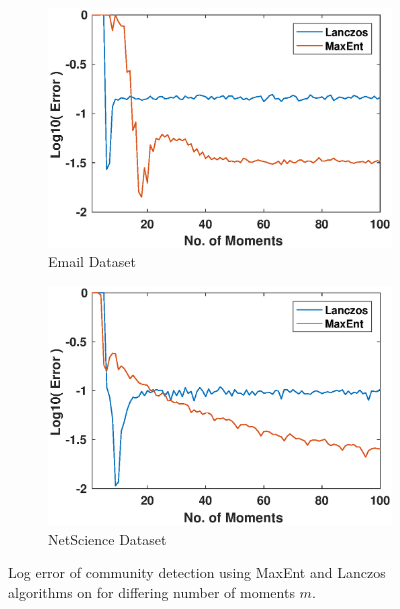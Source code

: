 \documentclass[letterpaper]{article} %
\begin{document}
\begin{figure}[t]
	\centering
	\begin{subfigure}
		\centering
		\includegraphics[trim=0.1cm 0cm 0.5cm 0.1cm, clip, width=1.0\linewidth]{Figures/Error_for_EmailL.eps}
		\caption{Email Dataset}
		\label{fig:emailerror}	
	\end{subfigure}%
	
	\begin{subfigure}
		\centering
		\includegraphics[trim=0.1cm 0cm 0.5cm 0.1cm, clip,  width=1.0\linewidth]{Figures/Error_for_NetscienceL.eps}
		\caption{NetScience Dataset}
		\label{fig:netscienceerror}
	\end{subfigure}
	\caption{Log error of community detection using MaxEnt and Lanczos algorithms on for differing number of moments $m$.}
	\label{fig:netscience}
\end{figure}
\end{document}
